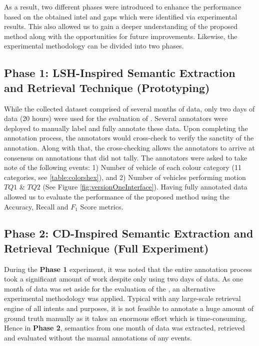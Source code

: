 As a result, two different phases were introduced to enhance the performance based on the obtained intel and gaps which were identified via experimental results. This also allowed us to gain a deeper understanding of the proposed method along with the opportunities for future improvements.
Likewise, the experimental methodology can be divided into two phases.


\subsection{Phase 1: LSH-Inspired Semantic Extraction and Retrieval Technique (Prototyping)}
While the collected dataset comprised of several months of data, only two days of data (20 hours) were used for the evaluation of \versionOneRet. Several annotators were deployed to manually label and fully annotate these data. Upon completing the annotation process, the annotators would cross-check to verify the sanctity of the annotation.
Along with that, the cross-checking allows the annotators to arrive at consensus on annotations that did not tally. The annotators were asked to take note of the following events:
1) Number of vehicle of each colour category (11 categories, see \ref{table:colorshex}), and 2) Number of vehicles performing motion $TQ1$ \& $TQ2$ (See Figure \ref{fig:versionOneInterface}).
Having fully annotated data allowed us to evaluate the performance of the proposed method using the Accuracy, Recall and $F_1$ Score metrics.

\subsection{Phase 2: CD-Inspired Semantic Extraction and Retrieval Technique (Full Experiment)}

During the \textbf{Phase 1} experiment, it was noted that the entire annotation process took a significant amount of work despite only using two days of data. As one month of data was set aside for the evaluation of the \versionTwoRet, an alternative experimental methodology was applied.
Typical with any large-scale retrieval engine of all intents and purposes, it is not feasible to annotate a huge amount of ground truth manually as it takes an enormous effort which is time-consuming.
Hence in \textbf{Phase 2}, semantics from one month of data was extracted, retrieved and evaluated without the manual annotations of any events.

